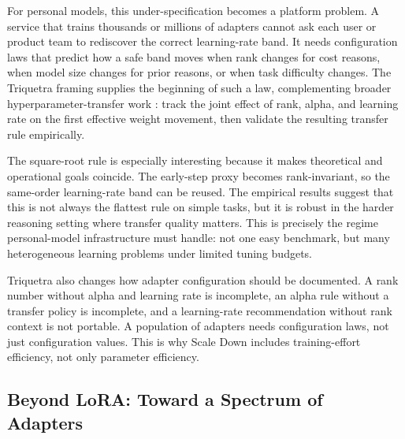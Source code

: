 For personal models, this under-specification becomes a platform problem. A service that trains thousands or millions of adapters cannot ask each user or product team to rediscover the correct learning-rate band. It needs configuration laws that predict how a safe band moves when rank changes for cost reasons, when model size changes for prior reasons, or when task difficulty changes. The Triquetra framing supplies the beginning of such a law, complementing broader hyperparameter-transfer work \citep{yang2022tensorprograms}: track the joint effect of rank, alpha, and learning rate on the first effective weight movement, then validate the resulting transfer rule empirically.

The square-root rule is especially interesting because it makes theoretical and operational goals coincide. The early-step proxy becomes rank-invariant, so the same-order learning-rate band can be reused. The empirical results suggest that this is not always the flattest rule on simple tasks, but it is robust in the harder reasoning setting where transfer quality matters. This is precisely the regime personal-model infrastructure must handle: not one easy benchmark, but many heterogeneous learning problems under limited tuning budgets.

Triquetra also changes how adapter configuration should be documented. A rank number without alpha and learning rate is incomplete, an alpha rule without a transfer policy is incomplete, and a learning-rate recommendation without rank context is not portable. A population of adapters needs configuration laws, not just configuration values. This is why Scale Down includes training-effort efficiency, not only parameter efficiency.





\subsection{Beyond LoRA: Toward a Spectrum of Adapters}\label{subsec:beyond-lora}

